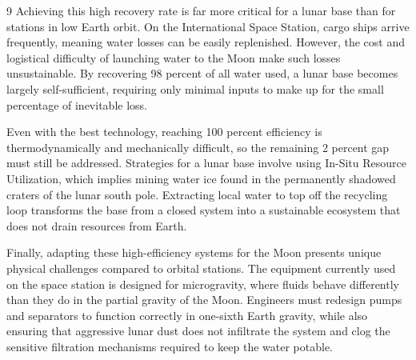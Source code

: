 \documentclass{mcmthesis}
\begin{document}
\begin{ReportAiUse}{9}
Achieving this high recovery rate is far more critical for a lunar base than for stations in low Earth orbit. On the International Space Station, cargo ships arrive frequently, meaning water losses can be easily replenished. However, the cost and logistical difficulty of launching water to the Moon make such losses unsustainable. By recovering 98 percent of all water used, a lunar base becomes largely self-sufficient, requiring only minimal inputs to make up for the small percentage of inevitable loss.

Even with the best technology, reaching 100 percent efficiency is thermodynamically and mechanically difficult, so the remaining 2 percent gap must still be addressed. Strategies for a lunar base involve using In-Situ Resource Utilization, which implies mining water ice found in the permanently shadowed craters of the lunar south pole. Extracting local water to top off the recycling loop transforms the base from a closed system into a sustainable ecosystem that does not drain resources from Earth.

Finally, adapting these high-efficiency systems for the Moon presents unique physical challenges compared to orbital stations. The equipment currently used on the space station is designed for microgravity, where fluids behave differently than they do in the partial gravity of the Moon. Engineers must redesign pumps and separators to function correctly in one-sixth Earth gravity, while also ensuring that aggressive lunar dust does not infiltrate the system and clog the sensitive filtration mechanisms required to keep the water potable.
\end{ReportAiUse}
\end{document}
